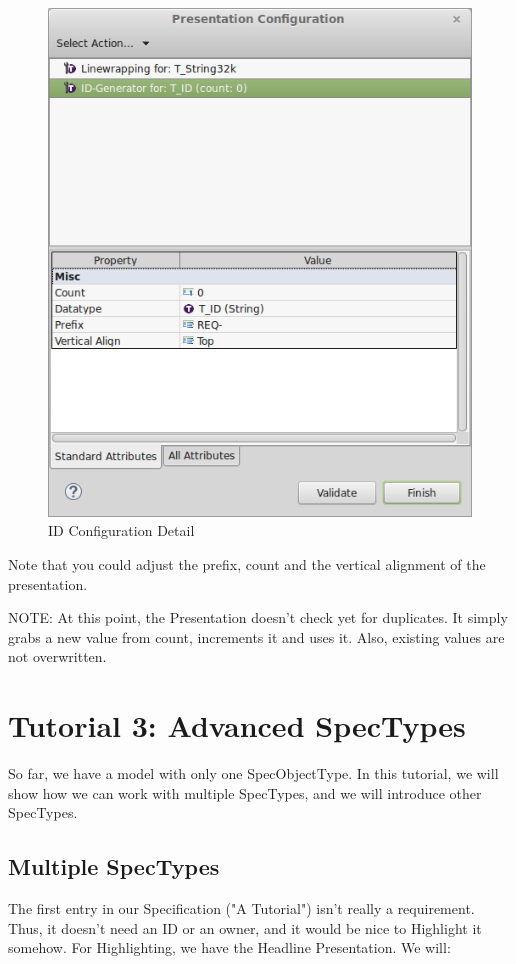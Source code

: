 \begin{figure}[h!]
\centering      
\includegraphics[width=0.8\linewidth]{../rmf-images/presentation_id.png}      
\caption{ID Configuration Detail}      
\label{fig:idConfig}
\end{figure}

Note that you could adjust the prefix, count and the vertical alignment of the presentation.

NOTE: At this point, the Presentation doesn't check yet for duplicates.
It simply grabs a new value from count, increments it and uses it.  Also,
existing values are not overwritten.

\section{Tutorial 3: Advanced SpecTypes}

So far, we have a model with only one SpecObjectType.  In this tutorial,
we will show how we can work with multiple SpecTypes, and we will
introduce other SpecTypes.

\subsection{Multiple SpecTypes}

The first entry in our Specification ("A \pror{} Tutorial") isn't really
a requirement.  Thus, it doesn't need an ID or an owner, and it would be
nice to Highlight it somehow.  For Highlighting, we have the Headline
Presentation.  We will:

